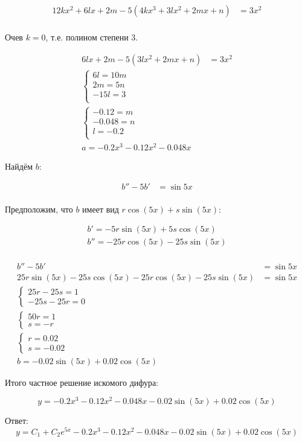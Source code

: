 \begin{align*}
    12kx^2 + 6lx + 2m - 5(4kx^3 + 3lx^2 + 2mx + n) & = 3x^2 \\
\end{align*}

Очев $k=0$, т.е. полином степени 3.

\begin{align*}
    6lx + 2m - 5(3lx^2 + 2mx + n) & = 3x^2 \\
    \begin{cases}
        6l = 10m \\
        2m = 5n  \\
        -15l = 3 \\
    \end{cases}              \\
    \begin{cases}
        -0.12 = m  \\
        -0.048 = n \\
        l = -0.2   \\
    \end{cases}              \\
    a = -0.2x^3 - 0.12x^2 - 0.048x
\end{align*}

Найдём $b$:

\begin{align*}
    b''-5b' & = \sin 5x \\
\end{align*}

Предположим, что $b$ имеет вид $r\cos(5x) + s\sin(5x)$:

\begin{align*}
    b' = -5r\sin(5x) + 5s\cos(5x)    \\
    b'' = -25r\cos(5x) - 25s\sin(5x) \\
\end{align*}

\begin{align*}
    b''-5b'                                              & = \sin 5x \\
    25r\sin(5x) - 25s\cos(5x) -25r\cos(5x) - 25s\sin(5x) & = \sin 5x \\
    \begin{cases}
        25r - 25s = 1 \\
        -25s - 25r = 0
    \end{cases}                                       \\
    \begin{cases}
        50r = 1 \\
        s = -r
    \end{cases}                                       \\
    \begin{cases}
        r = 0.02 \\
        s = -0.02
    \end{cases}                                       \\
    b = -0.02\sin(5x) +0.02\cos(5x)
\end{align*}

Итого частное решение искомого дифура:

\[y = -0.2x^3 - 0.12x^2 - 0.048x -0.02\sin(5x) +0.02\cos(5x)\]

Ответ:
\[y = C_1 + C_2e^{5x} -0.2x^3 - 0.12x^2 - 0.048x -0.02\sin(5x) +0.02\cos(5x)\]

